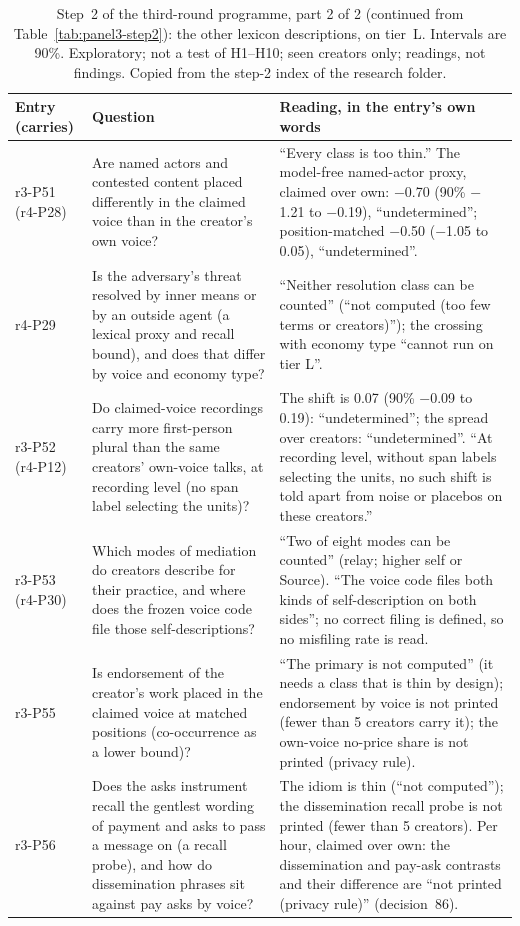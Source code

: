 \begin{table}[tp]
\centering
\footnotesize
\begin{tabular}{@{}>{\raggedright\arraybackslash}p{}>{\raggedright\arraybackslash}p{}p{}@{}}
\toprule
Entry (carries) & Question & Reading, in the entry's own words \\
\midrule
r3-P51 (r4-P28) & Are named actors and contested content placed differently in the claimed voice than in the
creator's own voice? & ``Every class is too thin.'' The model-free named-actor proxy, claimed over own: $-$0.70 (90\%
$-$1.21 to $-$0.19), ``undetermined''; position-matched $-$0.50 ($-$1.05 to 0.05), ``undetermined''. \\
r4-P29 & Is the adversary's threat resolved by inner means or by an outside agent (a lexical proxy and recall bound),
and does that differ by voice and economy type? & ``Neither resolution class can be counted'' (``not computed (too few
terms or creators)''); the crossing with economy type ``cannot run on tier L''. \\
r3-P52 (r4-P12) & Do claimed-voice recordings carry more first-person plural than the same creators' own-voice talks,
at recording level (no span label selecting the units)? & The shift is 0.07 (90\% $-$0.09 to 0.19): ``undetermined'';
the spread over creators: ``undetermined''. ``At recording level, without span labels selecting the units, no such
shift is told apart from noise or placebos on these creators.'' \\
r3-P53 (r4-P30) & Which modes of mediation do creators describe for their practice, and where does the frozen voice
code file those self-descriptions? & ``Two of eight modes can be counted'' (relay; higher self or Source). ``The voice
code files both kinds of self-description on both sides''; no correct filing is defined, so no misfiling rate is
read. \\
r3-P55 & Is endorsement of the creator's work placed in the claimed voice at matched positions (co-occurrence as a
lower bound)? & ``The primary is not computed'' (it needs a class that is thin by design); endorsement by voice is not
printed (fewer than 5 creators carry it); the own-voice no-price share is not printed (privacy rule). \\
r3-P56 & Does the asks instrument recall the gentlest wording of payment and asks to pass a message on (a recall
probe), and how do dissemination phrases sit against pay asks by voice? & The idiom is thin (``not computed''); the
dissemination recall probe is not printed (fewer than 5 creators). Per hour, claimed over own: the dissemination and
pay-ask contrasts and their difference are ``not printed (privacy rule)'' (decision~86). \\
\bottomrule
\end{tabular}
\caption{Step~2 of the third-round programme, part 2 of 2 (continued from Table~\ref{tab:panel3-step2}): the other
lexicon descriptions, on tier~L. Intervals are 90\%. Exploratory; not a test of H1--H10; seen creators only; readings,
not findings. Copied from the step-2 index of the research folder. \LabelValidity}
\label{tab:panel3-step2b}
\end{table}

